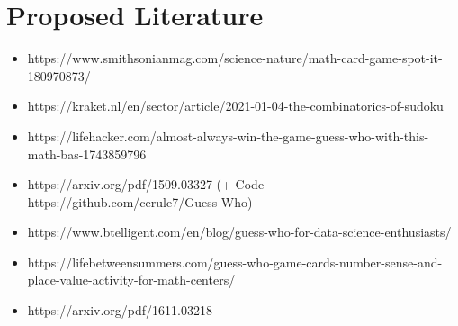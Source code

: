 \section{Proposed Literature}

\begin{itemize}
	\item https://www.smithsonianmag.com/science-nature/math-card-game-spot-it-180970873/
	\item https://kraket.nl/en/sector/article/2021-01-04-the-combinatorics-of-sudoku	
	 \item https://lifehacker.com/almost-always-win-the-game-guess-who-with-this-math-bas-1743859796
	\item https://arxiv.org/pdf/1509.03327 (+ Code https://github.com/cerule7/Guess-Who)
	\item https://www.btelligent.com/en/blog/guess-who-for-data-science-enthusiasts/
	\item https://lifebetweensummers.com/guess-who-game-cards-number-sense-and-place-value-activity-for-math-centers/
	\item https://arxiv.org/pdf/1611.03218
\end{itemize}

